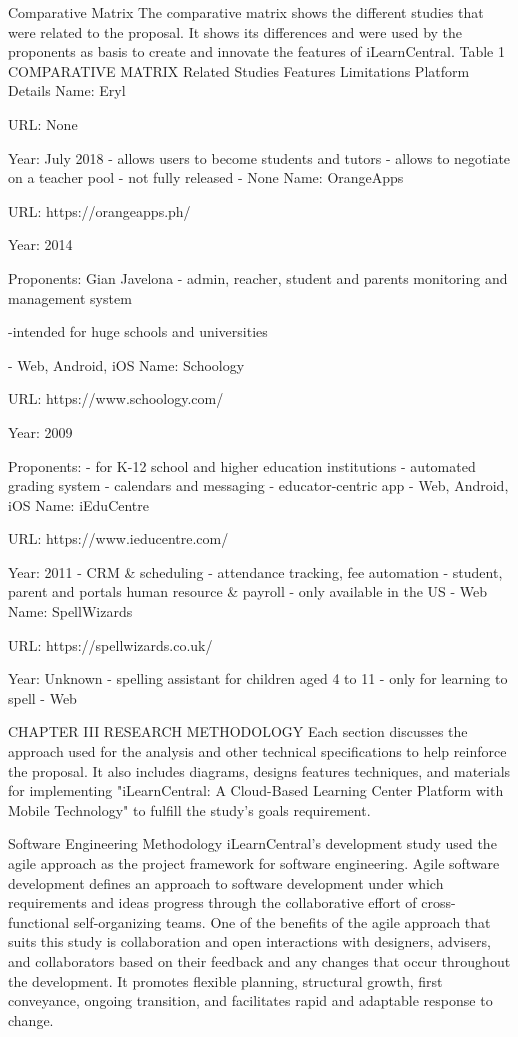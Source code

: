 Comparative Matrix 
The comparative matrix shows the different studies that were related to the proposal. It shows its differences and were used by the proponents as basis to create and innovate the features of iLearnCentral.
Table 1
COMPARATIVE MATRIX
Related Studies	Features	Limitations	Platform Details
Name: Eryl

URL: None

Year: July 2018	- allows users to become students and tutors
- allows to negotiate on a teacher pool	- not fully released	- None
 Name: OrangeApps

URL: https://orangeapps.ph/ 

Year: 2014

Proponents: Gian Javelona	- admin, reacher, student and parents monitoring and management system

	-intended for huge schools and universities

	- Web, Android, iOS
Name: Schoology

URL: https://www.schoology.com/ 

Year: 2009

Proponents: 	- for K-12 school and higher education institutions
- automated grading system
- calendars and messaging
	- educator-centric app 	- Web, Android, iOS
Name: iEduCentre

URL: https://www.ieducentre.com/ 

Year: 2011	- CRM & scheduling
- attendance tracking, fee automation
- student, parent and portals
human resource & payroll
	- only available in the US	- Web
Name: SpellWizards

URL: https://spellwizards.co.uk/

Year: Unknown	- spelling assistant for children aged 4 to 11	- only for learning to spell	- Web











 
CHAPTER III
RESEARCH METHODOLOGY
Each section discusses the approach used for the analysis and other technical specifications to help reinforce the proposal. It also includes diagrams, designs features techniques, and materials for implementing "iLearnCentral: A Cloud-Based Learning Center Platform with Mobile Technology" to fulfill the study's goals requirement.

Software Engineering Methodology
	iLearnCentral's development study used the agile approach as the project framework for software engineering. Agile software development defines an approach to software development under which requirements and ideas progress through the collaborative effort of cross-functional self-organizing teams.
One of the benefits of the agile approach that suits this study is collaboration and open interactions with designers, advisers, and collaborators based on their feedback and any changes that occur throughout the development. It promotes flexible planning, structural growth, first conveyance, ongoing transition, and facilitates rapid and adaptable response to change.
 
